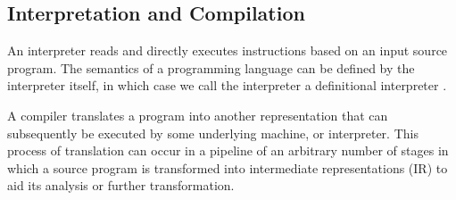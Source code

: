 \documentclass[a4paper,12pt,twoside,openright]{report}
\theoremstyle{definition}
\begin{document}
\subsection{Interpretation and Compilation}
An interpreter reads and directly executes instructions based on an input source program. The semantics of a programming language can be defined by the interpreter itself, in which case we call the interpreter a definitional interpreter \cite{reynolds1972definitional}.

A compiler translates a program into another representation that can subsequently be executed by some underlying machine, or interpreter. This process of translation can occur in a pipeline of an arbitrary number of stages in which a source program is transformed into intermediate representations (IR) to aid its analysis or further transformation.

\end{document}
